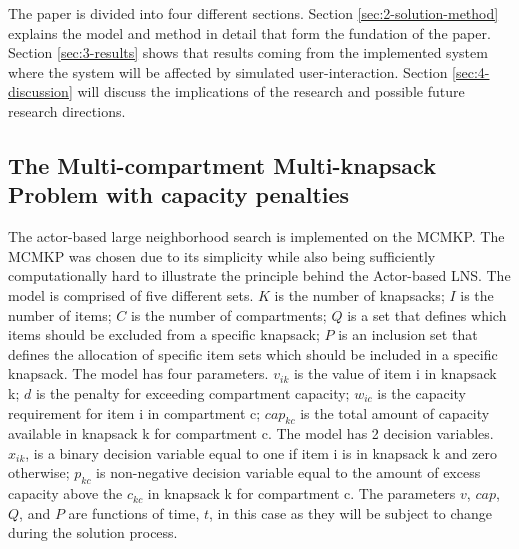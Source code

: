 \documentclass[preprint,12pt,authoryear]{elsarticle}
\begin{document}
The paper is divided into four different sections. Section \ref{sec:2-solution-method} explains the model and method in detail that form the fundation of the paper. 
Section \ref{sec:3-results} shows that results coming from the implemented system where the system will be affected by simulated user-interaction. Section \ref{sec:4-discussion} 
will discuss the implications of the research and possible future research directions.

\subsection{The Multi-compartment Multi-knapsack Problem with capacity penalties}
\label{sub1sec2}
The actor-based large neighborhood search is implemented on the MCMKP. The MCMKP was chosen due to its simplicity
while also being sufficiently computationally hard to illustrate the principle behind the Actor-based LNS. The model is comprised of 
five different sets. $K$ is the number of knapsacks; $I$ is the number of items; $C$ is the number of compartments; $Q$ is a set that
defines which items should be excluded from a specific knapsack; $P$ is an inclusion set that defines the allocation of specific item sets 
which should be included in a specific knapsack. The model has four parameters. $v_{ik}$ is the value of item i in knapsack k; $d$ is the 
penalty for exceeding compartment capacity; $w_{ic}$ is the capacity requirement for item i in compartment c; $cap_{kc}$ is the total amount 
of capacity available in knapsack k for compartment c. The model has 2 decision variables. $x_{ik}$, is a binary decision variable equal to one 
if item i is in knapsack k and zero otherwise; $p_{kc}$ is non-negative decision variable equal to the amount of excess capacity above 
the $c_{kc}$ in knapsack k for compartment c. The parameters $v$, $cap$, $Q$, and $P$ are functions of time, $t$, in this case as they will be 
subject to change during the solution process.
\end{document}
